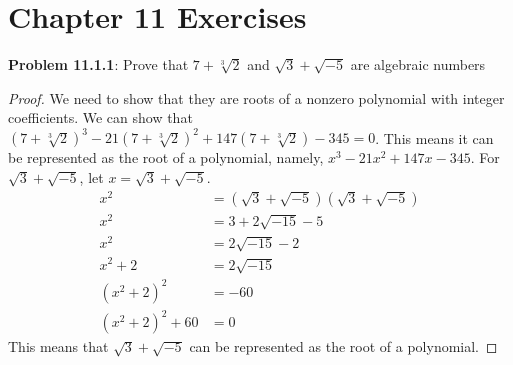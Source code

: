 \documentclass[12pt]{article}
\begin{document}
\newpage
\section*{Chapter 11 Exercises}
\textbf{Problem 11.1.1}: Prove that $7 + \sqrt[3]{2}$ and $\sqrt{3} + \sqrt{-5}$ are algebraic numbers
\begin{proof}
We need to show that they are roots of a nonzero polynomial with integer coefficients. We can show that $(7 + \sqrt[3]{2})^3 - 21(7 + \sqrt[3]{2})^2 + 147(7 + \sqrt[3]{2}) - 345 = 0$. This means it can be represented as the root of a polynomial, namely, $x^3 - 21x^2 + 147x - 345$. For $\sqrt{3} + \sqrt{-5}$, let $x = \sqrt{3} + \sqrt{-5}$.
\begin{align*}
  x^2 &= (\sqrt{3} + \sqrt{-5})(\sqrt{3} + \sqrt{-5}) \\
  x^2 &= 3 + 2\sqrt{-15} - 5 \\
  x^2 &= 2\sqrt{-15} - 2 \\
  x^2 + 2 &= 2\sqrt{-15} \\
  (x^2 + 2)^2 &= -60 \\
  (x^2 + 2)^2 + 60 &= 0
\end{align*}
This means that $\sqrt{3} + \sqrt{-5}$ can be represented as the root of a polynomial.
\end{proof}
\end{document}
